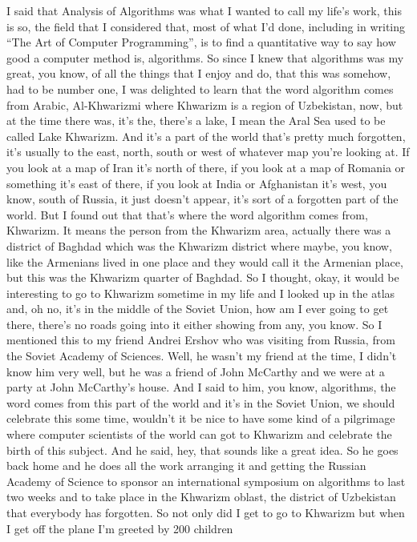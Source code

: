 \documentclass[]{article}
\begin{document}
I said that Analysis of Algorithms was what I wanted to call my life's
work, this is so, the field that I considered that, most of what I'd
done, including in writing ``The Art of Computer Programming'', is to
find a quantitative way to say how good a computer method is,
algorithms. So since I knew that algorithms was my great, you know, of
all the things that I enjoy and do, that this was somehow, had to be
number one, I was delighted to learn that the word algorithm comes from
Arabic, Al-Khwarizmi where Khwarizm is a region of Uzbekistan, now, but
at the time there was, it's the, there's a lake, I mean the Aral Sea
used to be called Lake Khwarizm. And it's a part of the world that's
pretty much forgotten, it's usually to the east, north, south or west of
whatever map you're looking at. If you look at a map of Iran it's north
of there, if you look at a map of Romania or something it's east of
there, if you look at India or Afghanistan it's west, you know, south of
Russia, it just doesn't appear, it's sort of a forgotten part of the
world. But I found out that that's where the word algorithm comes from,
Khwarizm. It means the person from the Khwarizm area, actually there was
a district of Baghdad which was the Khwarizm district where maybe, you
know, like the Armenians lived in one place and they would call it the
Armenian place, but this was the Khwarizm quarter of Baghdad. So I
thought, okay, it would be interesting to go to Khwarizm sometime in my
life and I looked up in the atlas and, oh no, it's in the middle of the
Soviet Union, how am I ever going to get there, there's no roads going
into it either showing from any, you know. So I mentioned this to my
friend Andrei Ershov who was visiting from Russia, from the Soviet
Academy of Sciences. Well, he wasn't my friend at the time, I didn't
know him very well, but he was a friend of John McCarthy and we were at
a party at John McCarthy's house. And I said to him, you know,
algorithms, the word comes from this part of the world and it's in the
Soviet Union, we should celebrate this some time, wouldn't it be nice to
have some kind of a pilgrimage where computer scientists of the world
can got to Khwarizm and celebrate the birth of this subject. And he
said, hey, that sounds like a great idea. So he goes back home and he
does all the work arranging it and getting the Russian Academy of
Science to sponsor an international symposium on algorithms to last two
weeks and to take place in the Khwarizm oblast, the district of
Uzbekistan that everybody has forgotten. So not only did I get to go to
Khwarizm but when I get off the plane I'm greeted by 200 children
\end{document}
